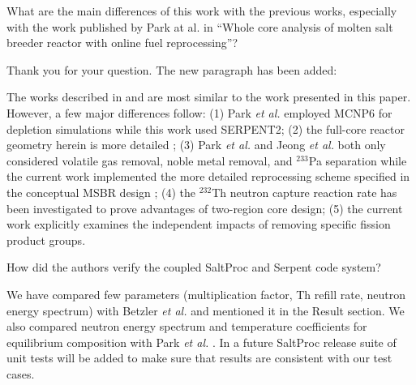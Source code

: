 \documentclass[answers,11pt]{exam}
\begin{document}
\begin{questions}
        \question  What are the main differences of this work with the previous 
        works, especially with the work published by Park at al. in ``Whole core 
        analysis of molten salt breeder reactor with online fuel reprocessing''?
        \begin{solution}
                Thank you for your question. The new paragraph has been added:

                The works described in \cite{park_whole_2015} and 
                \cite{jeong_equilibrium_2016} are most similar to the work 
                presented in this paper. However, a few major differences 
                follow: (1) Park \emph{et al.} employed MCNP6 for depletion 
                simulations while this work used SERPENT2; (2) the full-core 
                reactor geometry herein is more detailed 
                \cite{rykhlevskii_full-core_2017}; (3) Park \emph{et al.} and 
                Jeong \emph{et al.} both only considered volatile gas removal, 
                noble metal removal, and $^{233}$Pa separation while the 
                current work implemented the more detailed reprocessing scheme 
                specified in the conceptual \gls{MSBR} design 
                \cite{robertson_conceptual_1971}; (4) the $^{232}$Th neutron 
                capture reaction rate has been investigated to prove advantages 
                of two-region core design; (5) the current work explicitly 
                examines the independent impacts of removing specific fission 
                product groups.
        \end{solution}

        \question  How did the authors verify the coupled SaltProc and Serpent 
        code system?  
        \begin{solution}
                We have compared few parameters (multiplication factor, Th refill 
                rate, neutron energy spectrum) with Betzler \emph{et al.} 										
                \cite{betzler_molten_2017} and mentioned it in the Result section. 
                We also compared neutron energy spectrum and temperature coefficients
                 for equilibrium composition with Park \emph{et al.} \cite{park_whole_2015}.
                In a future SaltProc release suite of unit tests will be added 
                to make sure that results are consistent with our test cases.
        \end{solution}


\end{questions}
\end{document}
